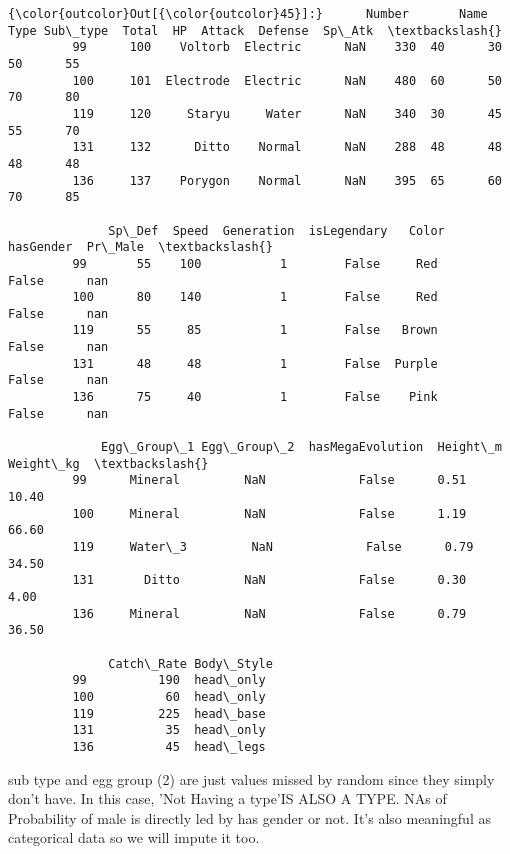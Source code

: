\documentclass[11pt]{article}
\begin{document}
\begin{Verbatim}[commandchars=\\\{\}]
{\color{outcolor}Out[{\color{outcolor}45}]:}      Number       Name      Type Sub\_type  Total  HP  Attack  Defense  Sp\_Atk  \textbackslash{}
         99      100    Voltorb  Electric      NaN    330  40      30       50      55   
         100     101  Electrode  Electric      NaN    480  60      50       70      80   
         119     120     Staryu     Water      NaN    340  30      45       55      70   
         131     132      Ditto    Normal      NaN    288  48      48       48      48   
         136     137    Porygon    Normal      NaN    395  65      60       70      85   
         
              Sp\_Def  Speed  Generation  isLegendary   Color  hasGender  Pr\_Male  \textbackslash{}
         99       55    100           1        False     Red      False      nan   
         100      80    140           1        False     Red      False      nan   
         119      55     85           1        False   Brown      False      nan   
         131      48     48           1        False  Purple      False      nan   
         136      75     40           1        False    Pink      False      nan   
         
             Egg\_Group\_1 Egg\_Group\_2  hasMegaEvolution  Height\_m  Weight\_kg  \textbackslash{}
         99      Mineral         NaN             False      0.51      10.40   
         100     Mineral         NaN             False      1.19      66.60   
         119     Water\_3         NaN             False      0.79      34.50   
         131       Ditto         NaN             False      0.30       4.00   
         136     Mineral         NaN             False      0.79      36.50   
         
              Catch\_Rate Body\_Style  
         99          190  head\_only  
         100          60  head\_only  
         119         225  head\_base  
         131          35  head\_only  
         136          45  head\_legs  
\end{Verbatim}
            
    sub type and egg group (2) are just values missed by random since they
simply don't have. In this case, 'Not Having a type'IS ALSO A TYPE. NAs
of Probability of male is directly led by has gender or not. It's also
meaningful as categorical data so we will impute it too.
\end{document}
